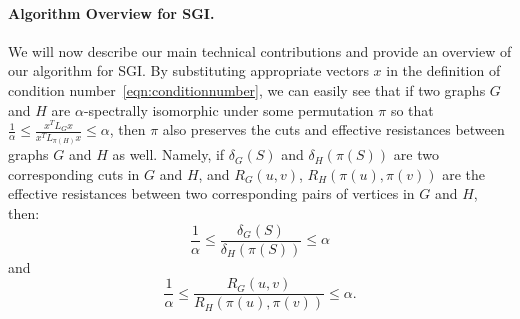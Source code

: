 \paragraph{\textbf {Algorithm Overview for SGI.} } 
We will now describe our main technical contributions and provide an
overview of our algorithm for SGI.
%
By substituting appropriate vectors $x$ in the definition of condition
number~\eqref{eqn:conditionnumber}, we can easily see that 
if two graphs $G$ and $H$ are $\alpha$-spectrally isomorphic under
some permutation $\pi$ so that
$\frac{1}{\alpha} \leq \frac{x^T L_{G} x}{x^T L_{\pi(H)} x} \leq
\alpha$, then $\pi$ also preserves the cuts and effective resistances
between graphs $G$ and $H$ as well. Namely, if $\delta_G(S)$ and
$\delta_{H}(\pi(S))$ are two corresponding cuts in $G$ and $H$, and
$R_G(u,v)$, $R_{H}(\pi(u),\pi(v))$ are the effective resistances
between two corresponding pairs of vertices in $G$ and $H$, then:
%
\begin{equation} \label{eqn:cuts} \frac{1}{\alpha} \leq
  \frac{\delta_G(S)}{\delta_{H}(\pi(S))} \leq \alpha
\end{equation}
%
and 
%
\begin{equation}\label{eqn:effectiveresistances}
  \frac{1}{\alpha} \leq \frac{R_G(u,v)}{R_{H}(\pi(u),\pi(v))} \leq \alpha.
\end{equation}
%
 
